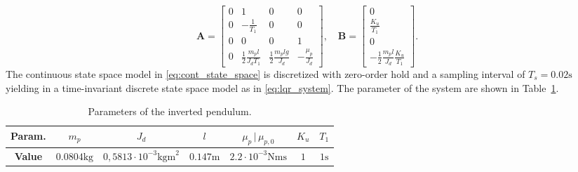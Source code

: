 \begin{equation}
    \mathbf{A} = \left[\begin{array}{cccc}
         0 & 1 & 0 & 0 \\
         0 & -\frac{1}{T_1} & 0 & 0\\
         0 & 0 & 0 & 1\\
         0 & \frac{1}{2}\frac{m_p l}{J_d T_1} &
     \frac{1}{2} \frac{m_p l g}{J_d} & -\frac{\mu_p}{J_d}
    \end{array} \right], \quad \mathbf{B} = \left[\begin{array}{c}
    0 \\
    \frac{K_u}{T_1} \\
    0 \\
    -\frac{1}{2}\frac{m_p l}{J_d}\frac{K_u}{T_1}
    \end{array} \right].
\end{equation}
The continuous state space model in \eqref{eq:cont_state_space} is discretized with zero-order hold and a sampling interval of $T_s=0.02\si{\second}$ yielding in a time-invariant discrete state space model as in \eqref{eq:lqr_system}. 
The parameter of the system are shown in Table~\ref{tab:params_lqr}.
\bgroup
\def\arraystretch{1.2}
\begin{table}[h]
    \centering
    \begin{tabular}{c||c c c c c c }
        \textbf{Param.} & $m_p$ &$J_d$&$l$&$\mu_p \,|\, \mu_{p,0}$&$K_u$ & $T_1$ \\\hline\hline
        \textbf{Value} & $0.0804\si{\kilogram}$ &$0,5813\cdot 10^{-3}\si{\kilogram\meter}^2$&$0.147\si{\meter}$&$2.2\cdot10^{-3}\si{\newton\meter\second}$&$1$ & $1\si{\second}$
    \end{tabular}
    \caption{Parameters of the inverted pendulum.}
    \label{tab:params_lqr}
\end{table}
\egroup

